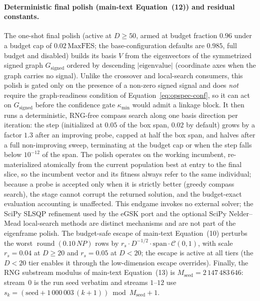 \documentclass[algorithms,article,submit,moreauthors,pdftex]{Definitions/mdpi}
\newcommand{\egsk}{eGSK}
\begin{document}
\paragraph{Deterministic final polish (main-text Equation~(12)) and residual constants.}
The one-shot final polish (active at $D\ge 50$, armed at budget fraction $0.96$
under a budget cap of $0.02\,\mathrm{MaxFES}$; the base-configuration defaults
are $0.985$, full budget and disabled) builds its basis $V$ from the
eigenvectors of the symmetrized signed graph $G_{\mathrm{signed}}$ ordered by
descending $\lvert\text{eigenvalue}\rvert$ (coordinate axes when the graph
carries no signal).  Unlike the crossover and local-search consumers, this polish
is gated only on the presence of a non-zero signed signal and does \emph{not}
require the graph-readiness condition of Equation~\eqref{eq:opspec-conf}, so it can
act on $G_{\mathrm{signed}}$ before the confidence gate $\kappa_{\min}$ would admit
a linkage block.  It then runs a deterministic, RNG-free compass search along one
basis direction per iteration: the step (initialized at $0.05$ of the box span,
$0.02$ by default) grows by a factor $1.3$ after an improving probe, capped at
half the box span, and halves after a full non-improving sweep, terminating at
the budget cap or when the step falls below $10^{-12}$ of the span.  The polish
operates on the working incumbent, re-materialized atomically from the current
population best at entry to the final slice, so the incumbent vector and its fitness
always refer to the same individual; because a probe is accepted only
when it is strictly better (greedy compass search), the stage cannot corrupt
the returned solution, and the
budget-exact evaluation accounting is unaffected.  This endgame
invokes no external solver; the SciPy SLSQP refinement used by the \egsk{} port
and the optional SciPy Nelder--Mead local-search methods are distinct mechanisms
and are not part of the eigenframe polish.  The budget-safe escape of
main-text Equation~(10) perturbs the worst $\operatorname{round}(0.10\,NP)$ rows by
$r_{s}\cdot D^{-1/2}\cdot\mathrm{span}\cdot\mathcal{C}(0,1)$, with scale
$r_{s}=0.04$ at $D\ge 20$ and $r_{s}=0.05$ at $D<20$; the escape is active at all
tiers (the $D<20$ tier enables it through the low-dimension escape
overrides).  Finally, the RNG substream
modulus of main-text Equation~(13) is $M_{\mathrm{seed}} = 2\,147\,483\,646$: stream~$0$ is the run seed
verbatim and streams $1$--$12$ use $s_k=(\text{seed}+1\,000\,003\,(k{+}1))\bmod
M_{\mathrm{seed}} + 1$.
\end{document}
